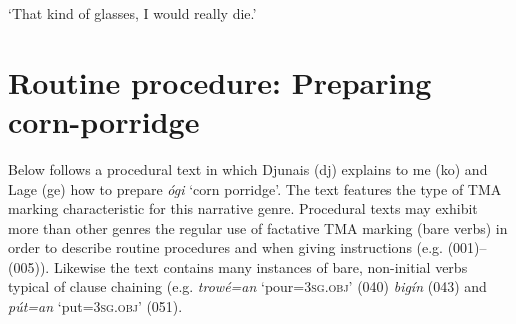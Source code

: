 {\glt
‘That kind of glasses, I would really die.’
  }\z
\section{Routine procedure: Preparing corn-porridge}

Below follows a procedural text in which Djunais (dj) explains to me (ko) and Lage (ge) how to prepare \textit{ógi} ‘corn porridge’. The text features the type of TMA marking characteristic for this narrative genre. Procedural texts may exhibit more than other genres the regular use of factative TMA marking (bare verbs) in order to describe routine procedures and when giving instructions (e.g. (001)–(005)). Likewise the text contains many instances of bare, non-initial verbs typical of clause chaining (e.g. \textit{trowé=an} ‘pour=\textsc{3sg.obj}’ (040) \textit{bigín} (043) and \textit{pút=an} ‘put={}\textsc{3sg.obj}’ (051).



